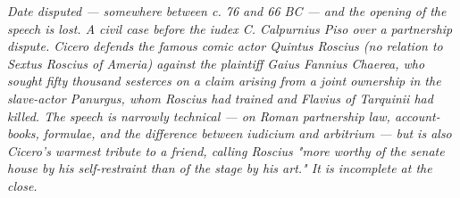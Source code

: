
\textit{Date disputed --- somewhere between c. 76 and 66 BC --- and the
opening of the speech is lost. A civil case before the iudex C. Calpurnius
Piso over a partnership dispute. Cicero defends the famous comic actor
Quintus Roscius (no relation to Sextus Roscius of Ameria) against the
plaintiff Gaius Fannius Chaerea, who sought fifty thousand sesterces on a
claim arising from a joint ownership in the slave-actor Panurgus, whom
Roscius had trained and Flavius of Tarquinii had killed. The speech is
narrowly technical --- on Roman partnership law, account-books, formulae,
and the difference between iudicium and arbitrium --- but is also Cicero's
warmest tribute to a friend, calling Roscius "more worthy of the senate
house by his self-restraint than of the stage by his art." It is incomplete
at the close.}
